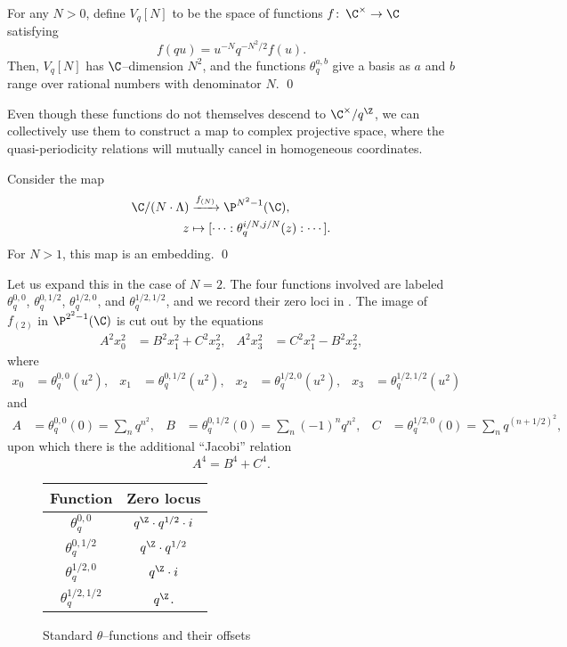 \begin{lemma}
For any $N > 0$, define $V_q[N]$ to be the space of functions $f\co \C^\times \to \C$ satisfying \[f(q u) = u^{-N}  q^{-N^2/2} f(u).\]  Then, $V_q[N]$ has $\C$--dimension $N^2$, and the functions $\theta_q^{a, b}$ give a basis as $a$ and $b$ range over rational numbers with denominator $N$. \qed
\end{lemma}

Even though these functions do not themselves descend to $\C^\times / q^{\Z}$, we can collectively use them to construct a map to complex projective space, where the quasi-periodicity relations will mutually cancel in homogeneous coordinates.
\begin{theorem}
Consider the map
\begin{align*}
\C / (N \cdot \Lambda) & \xrightarrow{f_{(N)}} \P^{N^2-1}(\C), \\
z & \mapsto [\cdots : \theta_q^{i/N, j/N}(z) : \cdots].
\end{align*}
For $N > 1$, this map is an embedding. \qed
\end{theorem}

\begin{example}
Let us expand this in the case of $N = 2$.  The four functions involved are labeled $\theta_q^{0,0}$, $\theta_q^{0,1/2}$, $\theta_q^{1/2,0}$, and $\theta_q^{1/2,1/2}$, and we record their zero loci in .  The image of $f_{(2)}$ in $\P^{2^2 - 1}(\C)$ is cut out by the equations
\begin{align*}
A^2 x_0^2 & = B^2 x_1^2 + C^2 x_2^2, &
A^2 x_3^2 & = C^2 x_1^2 - B^2 x_2^2,
\end{align*}
where
\begin{align*}
x_0 & = \theta_q^{0, 0}(u^2), &
x_1 & = \theta_q^{0, 1/2}(u^2), &
x_2 & = \theta_q^{1/2, 0}(u^2), &
x_3 & = \theta_q^{1/2, 1/2}(u^2)
\end{align*}
and
\begin{align*}
A & = \theta_q^{0, 0}(0) = \sum_n q^{n^2}, &
B & = \theta_q^{0, 1/2}(0) = \sum_n (-1)^n q^{n^2}, &
C & = \theta_q^{1/2, 0}(0) = \sum_n q^{(n + 1/2)^2},
\end{align*}
upon which there is the additional ``Jacobi'' relation \[A^4 = B^4 + C^4.\]
\end{example}

\begin{figure}
\begin{center}
\begin{tabular}{@{}cc@{}} \toprule
Function & Zero locus \\
\midrule
$\theta_q^{0,0}$ & $q^{\Z} \cdot q^{1/2} \cdot i$ \\
$\theta_q^{0,1/2}$ & $q^{\Z} \cdot q^{1/2}$ \\
$\theta_q^{1/2,0}$ & $q^{\Z} \cdot i$ \\
$\theta_q^{1/2,1/2}$ & $q^{\Z}$. \\ \bottomrule
\end{tabular}
\end{center}
\caption{Standard $\theta$--functions and their offsets}\label{ThetaFunctionsTable}
\end{figure}


